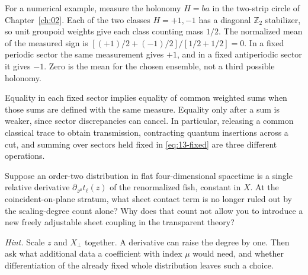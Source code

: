 For a numerical example, measure the holonomy $H=ba$ in the two-strip
circle of Chapter~\ref{ch:02}. Each of the two classes $H=+1,-1$ has a
diagonal $\mathbb Z_2$ stabilizer, so unit groupoid weights give each
class counting mass $1/2$. The normalized mean of the measured sign is
$[(+1)/2+(-1)/2]/[1/2+1/2]=0$. In a fixed periodic sector the same
measurement gives $+1$, and in a fixed antiperiodic sector it gives $-1$.
Zero is the mean for the chosen ensemble, not a third possible holonomy.

Equality in each fixed sector implies equality of common weighted sums
when those sums are defined with the same measure. Equality only after a
sum is weaker, since sector discrepancies can cancel. In particular,
releasing a common classical trace to obtain transmission, contracting
quantum insertions across a cut, and summing over sectors held fixed in
\eqref{eq:13-fixed} are three different operations.

\begin{exercise}
Suppose an order-two distribution in flat four-dimensional spacetime is a
single relative derivative $\partial_{z^\mu}t_\ell(z)$ of the renormalized
fish, constant in $X$. At the coincident-on-plane stratum, what sheet
contact term is no longer ruled out by the scaling-degree count alone?
Why does that count not allow you to introduce a new freely adjustable
sheet coupling in the transparent theory?
\end{exercise}
\noindent\emph{Hint.} Scale $z$ and $X_\perp$ together. A derivative can
raise the degree by one. Then ask what additional data a coefficient with
index $\mu$ would need, and whether differentiation of the already fixed
whole distribution leaves such a choice.
